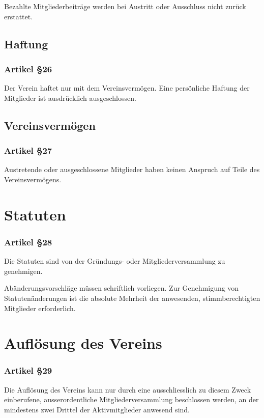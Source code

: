 \documentclass[a4paper,10pt,fleqn]{article}
\begin{document}
Bezahlte Mitgliederbeiträge werden bei Austritt oder 
Ausschluss nicht zurück erstattet.

\subsection{Haftung}

\subsubsection*{Artikel §26}
Der Verein haftet nur mit dem Vereinsvermögen. Eine
persönliche Haftung der Mitglieder ist ausdrücklich
ausgeschlossen.

\subsection{Vereinsvermögen}

\subsubsection*{Artikel §27}
Austretende oder ausgeschlossene Mitglieder haben keinen 
Anspruch auf Teile des Vereinsvermögens.

\section{Statuten}

\subsubsection*{Artikel §28}
Die Statuten sind von der Gründungs- oder 
Mitgliederversammlung zu genehmigen.

Abänderungsvorschläge müssen schriftlich vorliegen.
Zur Genehmigung von Statutenänderungen ist die absolute
Mehrheit der anwesenden, stimmberechtigten Mitglieder
erforderlich.

\section{Auflösung des Vereins}

\subsubsection*{Artikel §29}
Die Auflösung des Vereins kann nur durch eine
ausschliesslich zu diesem Zweck einberufene,
ausserordentliche Mitgliederversammlung beschlossen werden,
an der mindestens zwei Drittel der Aktivmitglieder anwesend
sind.
\end{document}
